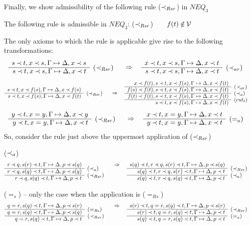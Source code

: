 \noindent
Finally, we show admissibility of the following rule ($\mathbin{\prec}_{Rsr}$) in $NEQ_3$
\begin{LEMMA}\label{le:Inclsstar}
The following rule is admissible in $NEQ_3$:
 ($\mathbin{\prec}_{Rsr}$)\ \ \ \ 
$f(t)\not\in\Vars$
\end{LEMMA}
\begin{PROOF}
The only axioms to which the rule is applicable give rise to the following
transformations:
\[
\begin{array}{rl}
s\Incl t, x\Incl s,\GSD,x\Incl s \\ \cline{1-1}
s\Incl t, x\Incl s,\GSD,x\Incl t & \rabove{(\Rsr)}
\end{array}
\conv
\begin{array}{rl}
x\Incl t,x\Incl s,\GSD,x\Incl t  \\ \cline{1-1}
s\Incl t,x\Incl s,\GSD,x\Incl t  & \rabove{(\Incl_{ar})}
\end{array}
\]
\[\prarc{
s\Incl t, x\Incl f(s),\GSD,x\Incl f(s) \cl
s\Incl t, x\Incl f(s),\GSD,x\Incl f(t) & \rabove{(\Rsr)}
}
\conv
\prarc{
x\Incl f(t),s\Incl t, x\Incl f(s),\GSD,x\Incl f(t) \cl
f(s)\Incl f(t),s\Incl t, x\Incl f(s),\GSD,x\Incl f(t) & \rabove{(\Incl_{ar})} \cl
f(t)\Incl f(t),s\Incl t, x\Incl f(s),\GSD,x\Incl f(t) & \rabove{(\Incl_{a})} \cl
   s\Incl t, x\Incl f(s),\GSD,x\Incl f(t) & \rabove{(cut_t)} 
}
\]
\[\prarc{
y\Incl t, x=y,\GSD,x\Incl y \cl
y\Incl t, x=y,\GSD,x\Incl t & \rabove{(\Rsr)} 
}
\conv
\prarc{
x\Incl t, x=y,\GSD,x\Incl t \cl
y\Incl t, x=y,\GSD,x\Incl t & \rabove{(=_{a})} 
}
\]
So, consider the rule just above the uppermost application of ($\mathbin{\prec}_{Rsr}$)
\begin{LS}
\item ($\mathbin{\prec}_a$)
\[\prar{
r\Incl q, s(r)\Incl t,\GSD,p\Incl s(q) \cl
r\Incl q, s(q)\Incl t,\GSD,p\Incl s(q) & \rabove{(\Incl_a)} \cl
r\Incl q, s(q)\Incl t,\GSD,p\Incl t & \rabove{(\Rsr)} 
}
\conv
\prar{
s(q)\Incl t,r\Incl q, s(r)\Incl t,\GSD,p\Incl s(q) \cl
s(q)\Incl t,r\Incl q, s(r)\Incl t,\GSD,p\Incl t & \rabove{(\Rsr)} \cl
s(q)\Incl t,r\Incl q, s(q)\Incl t,\GSD,p\Incl t & \rabove{(\Incl_a)}
}
\]
\item ($=_s$) -- only the case when the application is ($=_{Rs}$)
\[
\prar{
q=r, s(q)\Incl t,\GSD, p\Incl s(r) \cl
q=r, s(q)\Incl t,\GSD, p\Incl s(q) & \rabove{(=_{Rs})} \cl
q=r, s(q)\Incl t,\GSD, p\Incl t & \rabove{(\Rsr)} 
}
\conv
\prar{
s(r)\Incl t, q=r, s(q)\Incl t,\GSD, p\Incl s(r) \cl
s(r)\Incl t, q=r, s(q)\Incl t,\GSD, p\Incl t & \rabove{(\Rsr)} \cl
s(q)\Incl t, q=r, s(q)\Incl t,\GSD, p\Incl t & \rabove{(=_a)} 
}\]
\end{LS}
\end{PROOF}
